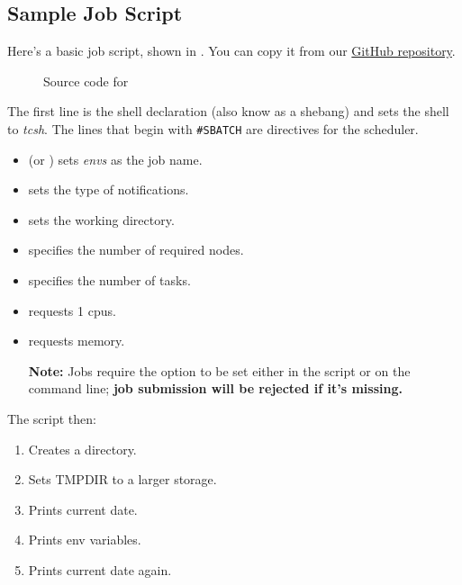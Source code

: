 \subsection{Sample Job Script}
\label{sect:sample-job-script}

Here's a basic job script,  shown in .
You can copy it from our \href{https://github.com/NAG-DevOps/speed-hpc}{GitHub repository}.

\small
\begin{figure}[htpb]
	
	\caption{Source code for }
	\label{fig:env.sh}
\end{figure}
\normalsize

\noindent The first line is the shell declaration (also know as a shebang) and sets the shell to \emph{tcsh}.
The lines that begin with \texttt{\#SBATCH} are directives for the scheduler.

\begin{itemize}
	\item {} (or ) sets \emph{envs} as the job name.
	\item {} sets the type of notifications.
	\item {} sets the working directory.
	\item {} specifies the number of required nodes.
	\item {} specifies the number of tasks.
	\item {} requests 1 cpus.
	\item {} requests memory.

    \textbf{Note:} Jobs require the  option to be set either in the script
	or on the command line; \textbf{job submission will be rejected if it's missing.}
\end{itemize}

\noindent The script then:
\begin{enumerate}
    \item Creates a directory.
	\item Sets TMPDIR to a larger storage.
	\item Prints current date.
	\item Prints env variables.
	\item Prints current date again.
\end{enumerate}

